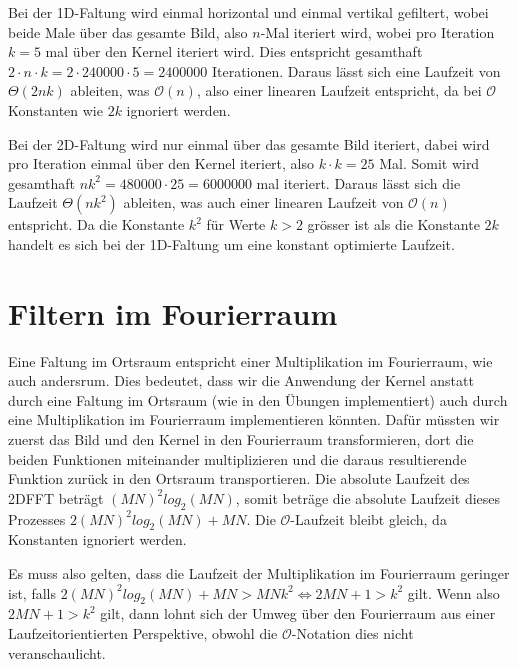 \documentclass{article} %
\begin{document}
Bei der 1D-Faltung wird einmal horizontal und einmal vertikal gefiltert, wobei beide Male über das gesamte Bild, also $n$-Mal iteriert wird, wobei pro Iteration $k = 5$ mal über den Kernel iteriert wird. Dies entspricht gesamthaft $2 \cdot n \cdot k = 2 \cdot 240000 \cdot 5 = 2400000$ Iterationen. Daraus lässt sich eine Laufzeit von $\Theta (2nk)$ ableiten, was $\mathcal{O} (n)$, also einer linearen Laufzeit entspricht, da bei $\mathcal{O}$ Konstanten wie $2k$ ignoriert werden.

Bei der 2D-Faltung wird nur einmal über das gesamte Bild iteriert, dabei wird pro Iteration einmal über den Kernel iteriert, also $k \cdot k = 25$ Mal. Somit wird gesamthaft $nk^2 = 480000 \cdot 25 = 6000000$ mal iteriert. Daraus lässt sich die Laufzeit $\Theta (nk^2)$ ableiten, was auch einer linearen Laufzeit von $\mathcal{O} (n)$ entspricht. Da die Konstante $k^2$ für Werte $k > 2$ grösser ist als die Konstante $2k$ handelt es sich bei der 1D-Faltung um eine konstant optimierte Laufzeit.

\section{Filtern im Fourierraum}

Eine Faltung im Ortsraum  entspricht einer Multiplikation im Fourierraum, wie auch andersrum. Dies bedeutet, dass wir die Anwendung der Kernel anstatt durch eine Faltung im Ortsraum (wie in den Übungen implementiert) auch durch eine Multiplikation im Fourierraum implementieren könnten. Dafür müssten wir zuerst das Bild und den Kernel in den Fourierraum transformieren, dort die beiden Funktionen miteinander multiplizieren und die daraus resultierende Funktion zurück in den Ortsraum transportieren. Die absolute Laufzeit des 2DFFT beträgt $(MN)^2 log_2(MN)$, somit beträge die absolute Laufzeit dieses Prozesses $2(MN)^2 log_2(MN) + MN$. Die $\mathcal{O}$-Laufzeit bleibt gleich, da Konstanten ignoriert werden.

Es muss also gelten, dass die Laufzeit der Multiplikation im Fourierraum geringer ist, falls $2(MN)^2 log_2(MN) + MN > MNk^2 \Leftrightarrow 2MN + 1 > k^2$ gilt. Wenn also $2MN + 1 > k^2$ gilt, dann lohnt sich der Umweg über den Fourierraum aus einer Laufzeitorientierten Perspektive, obwohl die $\mathcal{O}$-Notation dies nicht veranschaulicht.
\end{document}
